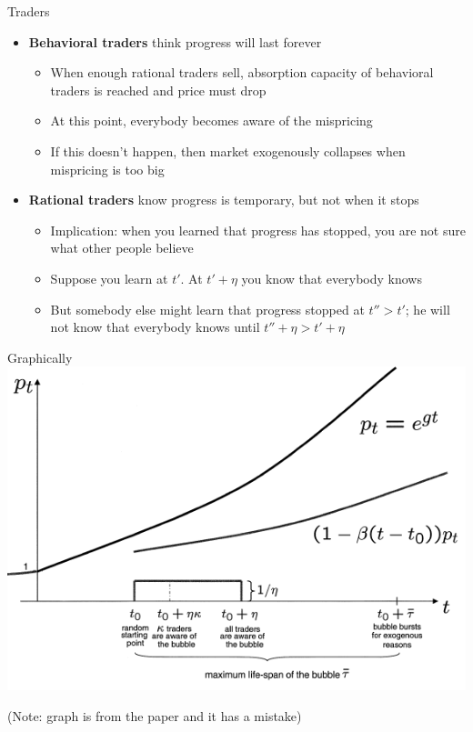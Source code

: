 \documentclass[english,10pt
,aspectratio=169
]{beamer}
\begin{document}
\begin{frame}{Traders}
	\begin{itemize}
		\item \textbf{Behavioral traders} think progress will last forever
		\begin{itemize}
			\item When enough rational traders sell, absorption capacity of behavioral traders is reached and  price must drop
			\item At this point, everybody becomes aware of the mispricing
			\item If this doesn't happen, then market exogenously collapses when mispricing is too big
		\end{itemize}
		\item \textbf{Rational traders} know progress is temporary, but not when it stops
		\begin{itemize}
			\item Implication: when you learned that progress has stopped, you are not sure what other people believe
			\item Suppose you learn at $t'$. At $t' + \eta$ you know that everybody knows
			\item But somebody else might learn that progress stopped at $t''>t'$; he will not know that everybody knows until $t''+\eta>t'+\eta$
		\end{itemize}
	\end{itemize}
\end{frame}


\begin{frame}{Graphically}
	\center
	\includegraphics[width=0.57 \paperwidth]{pics/AbreuBrun}
	
	(Note: graph is from the paper and it has a mistake)
\end{frame}
\end{document}
